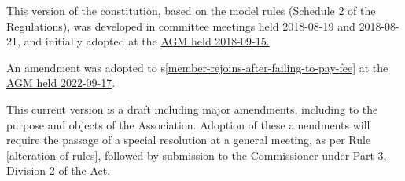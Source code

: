 \documentclass[../constitution.tex]{subfiles}
\begin{document}

This version of the constitution, based on the \href{https://www.commerce.wa.gov.au/consumer-protection/model-rules}{model rules} (Schedule 2 of the Regulations), was developed in committee meetings held 2018-08-19 and 2018-08-21, and initially adopted at the \href{https://wiki.artifactory.org.au/en/minutes/AGM/2018-09-15}{AGM held 2018-09-15.}

An amendment was adopted to s\ref{member-rejoins-after-failing-to-pay-fee} at the \href{https://wiki.artifactory.org.au/en/minutes/AGM/2022-09-17}{AGM held 2022-09-17}.

This current version is a draft including major amendments, including to the purpose and objects of the Association. Adoption of these amendments will require the passage of a special resolution at a general meeting, as per Rule \ref{alteration-of-rules}, followed by submission to the Commissioner under Part 3, Division 2 of the Act.
\end{document}
